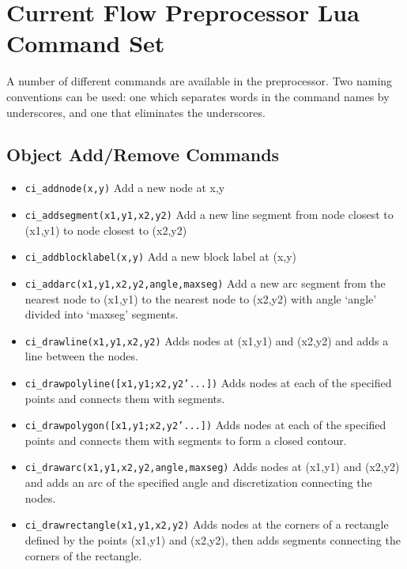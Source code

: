 \section{Current Flow Preprocessor Lua Command Set}

A number of different commands are available in the preprocessor.
Two naming conventions can be used: one which separates words in
the command names by underscores, and one that eliminates the
underscores.

\subsection{Object Add/Remove Commands}
\begin{itemize}
\item {\tt ci\_addnode(x,y)} Add a new node at x,y

\item {\tt ci\_addsegment(x1,y1,x2,y2)} Add a new line segment from node closest to
(x1,y1) to node closest to (x2,y2)

\item {\tt ci\_addblocklabel(x,y)} Add a new block label at (x,y)

\item {\tt ci\_addarc(x1,y1,x2,y2,angle,maxseg)} Add a new arc segment from the
nearest node to (x1,y1) to the nearest node to (x2,y2) with angle `angle'
divided into `maxseg' segments.

\item{\tt ci\_drawline(x1,y1,x2,y2)} Adds nodes at (x1,y1) and
(x2,y2) and adds a line between the nodes.

\item{\tt ci\_drawpolyline([x1,y1;x2,y2'...])} Adds nodes at each
of the specified points and connects them with segments.

\item{\tt ci\_drawpolygon([x1,y1;x2,y2'...])} Adds nodes at each
of the specified points and connects them with segments to form a
closed contour.

\item{\tt ci\_drawarc(x1,y1,x2,y2,angle,maxseg)} Adds nodes at
(x1,y1) and (x2,y2) and adds an arc of the specified angle and
discretization connecting the nodes.

\item{\tt ci\_drawrectangle(x1,y1,x2,y2)} Adds nodes at the
corners of a rectangle defined by the points (x1,y1) and (x2,y2),
then adds segments connecting the corners of the rectangle.


\end{itemize}
